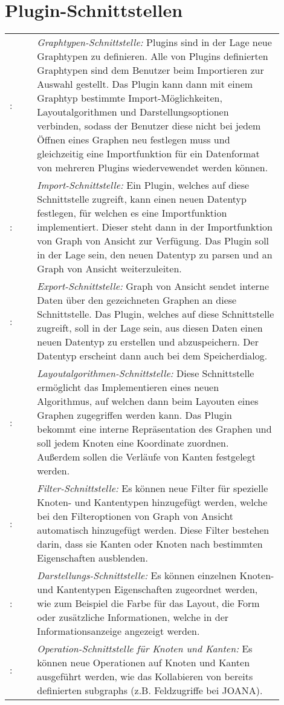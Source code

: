 \chapter{Plugin-Schnittstellen}
\label{ch:plugschnitt}


\setcounter{psnr}{10}
\newcommand{\psno}{\ifnum\value{psnr}<10 00\else\ifnum\value{psnr}<100 0\fi\fi\arabic{psnr}}
\newcommand\ps[2]{\namedlabel{s:#1}{/S\psno/}\addtocounter{psnr}{10}: & #2 \\ [1ex] }

\begin{tabular}{lp{0.9\linewidth}}
  \ps{graphtyp}{\textit{Graphtypen-Schnittstelle:} Plugins sind in der Lage neue Graphtypen zu definieren. Alle von Plugins definierten Graphtypen sind dem Benutzer beim Importieren zur Auswahl gestellt. Das Plugin kann dann mit einem Graphtyp bestimmte Import-Möglichkeiten, Layoutalgorithmen und Darstellungsoptionen verbinden, sodass der Benutzer diese nicht bei jedem Öffnen eines Graphen neu festlegen muss und gleichzeitig eine Importfunktion für ein Datenformat von mehreren Plugins wiedervewendet werden können.}
  \ps{import}{\textit{Import-Schnittstelle:} Ein Plugin, welches auf diese Schnittstelle zugreift, kann einen neuen Datentyp festlegen, für welchen es eine Importfunktion implementiert. Dieser steht dann in der Importfunktion von Graph von Ansicht zur Verfügung. Das Plugin soll in der Lage sein, den neuen Datentyp zu parsen und an Graph von Ansicht weiterzuleiten.}
  \ps{export}{\textit{Export-Schnittstelle:} Graph von Ansicht sendet interne Daten über den gezeichneten Graphen an diese Schnittstelle. Das Plugin, welches auf diese Schnittstelle zugreift, soll in der Lage sein, aus diesen Daten einen neuen Datentyp zu erstellen und abzuspeichern. Der Datentyp erscheint dann auch bei dem Speicherdialog.}
  \ps{layoutalgo}{\textit{Layoutalgorithmen-Schnittstelle:} Diese Schnittstelle ermöglicht das Implementieren eines neuen Algorithmus, auf welchen dann beim Layouten eines Graphen zugegriffen werden kann. Das Plugin bekommt eine interne Repräsentation des Graphen und soll jedem Knoten eine Koordinate zuordnen. Außerdem sollen die Verläufe von Kanten festgelegt werden.}
  \ps{filter}{\textit{Filter-Schnittstelle:} Es können neue Filter für spezielle Knoten- und Kantentypen hinzugefügt werden, welche bei den Filteroptionen von Graph von Ansicht automatisch hinzugefügt werden. Diese Filter bestehen darin, dass sie Kanten oder Knoten nach bestimmten Eigenschaften ausblenden.}
  \ps{darstellung}{\textit{Darstellungs-Schnittstelle:} Es können einzelnen Knoten- und Kantentypen Eigenschaften zugeordnet werden, wie zum Beispiel die Farbe für das Layout, die Form oder zusätzliche Informationen, welche in der Informationsanzeige angezeigt werden.}
  \ps{operationen}{\textit{Operation-Schnittstelle für Knoten und Kanten:} Es können neue Operationen auf Knoten und Kanten ausgeführt werden, wie das Kollabieren von bereits definierten \glspl{subgraph} (z.B. Feldzugriffe bei JOANA).}
\end{tabular}
